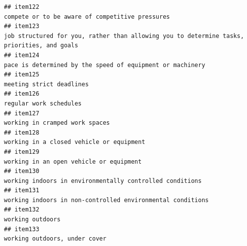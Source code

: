 \documentclass[
  man]{apa6}
\begin{document}
\begin{verbatim}
## item122                                                                                                                                                                           compete or to be aware of competitive pressures
## item123                                                                                                                                job structured for you, rather than allowing you to determine tasks, priorities, and goals
## item124                                                                                                                                                                 pace is determined by the speed of equipment or machinery
## item125                                                                                                                                                                                                  meeting strict deadlines
## item126                                                                                                                                                                                                    regular work schedules
## item127                                                                                                                                                                                           working in cramped work spaces 
## item128                                                                                                                                                                                  working in a closed vehicle or equipment
## item129                                                                                                                                                                                  working in an open vehicle or equipment 
## item130                                                                                                                                                                  working indoors in environmentally controlled conditions
## item131                                                                                                                                                               working indoors in non-controlled environmental conditions 
## item132                                                                                                                                                                                                          working outdoors
## item133                                                                                                                                                                                             working outdoors, under cover

\end{verbatim}
\end{document}
